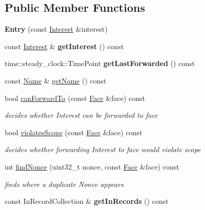 \subsection*{Public Member Functions}
\begin{DoxyCompactItemize}
\item 
{\bfseries Entry} (const \hyperlink{classndn_1_1Interest}{Interest} \&interest)\hypertarget{classnfd_1_1pit_1_1Entry_a55291aecd23b197efce62336a2427d50}{}\label{classnfd_1_1pit_1_1Entry_a55291aecd23b197efce62336a2427d50}

\item 
const \hyperlink{classndn_1_1Interest}{Interest} \& {\bfseries get\+Interest} () const\hypertarget{classnfd_1_1pit_1_1Entry_a4bdb20bf267995751f6609773f324596}{}\label{classnfd_1_1pit_1_1Entry_a4bdb20bf267995751f6609773f324596}

\item 
time\+::steady\+\_\+clock\+::\+Time\+Point {\bfseries get\+Last\+Forwarded} () const\hypertarget{classnfd_1_1pit_1_1Entry_a998cfec0137f0eca0ee1d32423a67b37}{}\label{classnfd_1_1pit_1_1Entry_a998cfec0137f0eca0ee1d32423a67b37}

\item 
const \hyperlink{classndn_1_1Name}{Name} \& \hyperlink{classnfd_1_1pit_1_1Entry_a2fa4df45aeb30f7fdaff5784faaf3e0b}{get\+Name} () const
\item 
bool \hyperlink{classnfd_1_1pit_1_1Entry_a25964254c3d8dde8c455cd3961cb4b8e}{can\+Forward\+To} (const \hyperlink{classnfd_1_1Face}{Face} \&face) const
\begin{DoxyCompactList}\small\item\em decides whether Interest can be forwarded to face \end{DoxyCompactList}\item 
bool \hyperlink{classnfd_1_1pit_1_1Entry_ac24153cc1619e5b793ded81298b396cd}{violates\+Scope} (const \hyperlink{classnfd_1_1Face}{Face} \&face) const
\begin{DoxyCompactList}\small\item\em decides whether forwarding Interest to face would violate scope \end{DoxyCompactList}\item 
int \hyperlink{classnfd_1_1pit_1_1Entry_a92a1e9c7e246a7396a0cae1bf7b624fe}{find\+Nonce} (uint32\+\_\+t nonce, const \hyperlink{classnfd_1_1Face}{Face} \&face) const
\begin{DoxyCompactList}\small\item\em finds where a duplicate Nonce appears \end{DoxyCompactList}\item 
const In\+Record\+Collection \& {\bfseries get\+In\+Records} () const\hypertarget{classnfd_1_1pit_1_1Entry_ae79709832ddba3a3aec638c27cd012d4}{}\label{classnfd_1_1pit_1_1Entry_ae79709832ddba3a3aec638c27cd012d4}


\end{DoxyCompactItemize}
